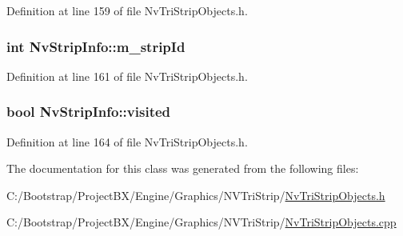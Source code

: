 Definition at line 159 of file NvTriStripObjects.h.\hypertarget{class_nv_strip_info_d22113688db1e746fb0956473ceca96f}{
\subsubsection[{m\_\-stripId}]{\setlength{\rightskip}{0pt plus 5cm}int {\bf NvStripInfo::m\_\-stripId}}}
\label{class_nv_strip_info_d22113688db1e746fb0956473ceca96f}




Definition at line 161 of file NvTriStripObjects.h.\hypertarget{class_nv_strip_info_670cb128ad83879668b1a8e90ed2462c}{
\subsubsection[{visited}]{\setlength{\rightskip}{0pt plus 5cm}bool {\bf NvStripInfo::visited}}}
\label{class_nv_strip_info_670cb128ad83879668b1a8e90ed2462c}




Definition at line 164 of file NvTriStripObjects.h.

The documentation for this class was generated from the following files:\begin{CompactItemize}
\item 
C:/Bootstrap/ProjectBX/Engine/Graphics/NVTriStrip/\hyperlink{_nv_tri_strip_objects_8h}{NvTriStripObjects.h}\item 
C:/Bootstrap/ProjectBX/Engine/Graphics/NVTriStrip/\hyperlink{_nv_tri_strip_objects_8cpp}{NvTriStripObjects.cpp}\end{CompactItemize}
